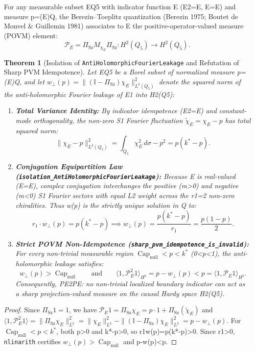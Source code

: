 \documentclass[11pt,reqno]{amsart}
\newtheorem{theorem}{Theorem}[section]
\theoremstyle{definition}
\theoremstyle{remark}
\newcommand{\CapNull}{\operatorname{Cap}_{\mathrm{null}}}
\newcommand{\PiSz}{\Pi_{\mathrm{Sz}}}
\newcommand{\Id}{\mathbb{I}}
\begin{document}
For any measurable subset EQ5 with indicator function E (E2=E, E=E) and measure p=(E)Q, the Berezin--Toeplitz quantization (Berezin 1975; Boutet de Monvel \& Guillemin 1981) associates to E the positive-operator-valued measure (POVM) element:
\begin{equation}
  \mathcal{P}_E = \PiSz M_{\chi_E} \PiSz : H^2(Q_5) \to H^2(Q_5).
\end{equation}

\begin{theorem}[Isolation of \texttt{AntiHolomorphicFourierLeakage} and Refutation of Sharp PVM Idempotence]
\label{thm:povm_leakage}
Let EQ5 be a Borel subset of normalized measure p=(E)Q, and let $w_\perp(p) = \|(\Id - \PiSz)\chi_E\|_{L^2(Q_5)}^2$ denote the squared norm of the anti-holomorphic Fourier leakage of E1 into H2(Q5):
\begin{enumerate}[label=(\roman*)]
  \item \textbf{Total Variance Identity:} By indicator idempotence (E2=E) and constant-mode orthogonality, the non-zero S1 Fourier fluctuation $\widetilde{\chi}_E = \chi_E - p$ has total squared norm:
  \begin{equation}
    \|\chi_E - p\|_{L^2(Q_5)}^2 = \int_{Q_5} \chi_E^2\,d\sigma - p^2 = p(k^* - p).
  \end{equation}
  \item \textbf{Conjugation Equipartition Law (\texttt{isolation\_AntiHolomorphicFourierLeakage}):} Because E is real-valued (E=E), complex conjugation interchanges the positive (m>0) and negative (m<0) S1 Fourier sectors with equal L2 weight across the r1=2 non-zero chiralities. Thus w(p) is the strictly unique solution in Q to:
  \begin{equation}
    r_1 \cdot w_\perp(p) = p(k^* - p) \implies w_\perp(p) = \frac{p(k^* - p)}{r_1} = \frac{p(1 - p)}{2}.
  \end{equation}
  \item \textbf{Strict POVM Non-Idempotence (\texttt{sharp\_pvm\_idempotence\_is\_invalid}):} For every non-trivial measurable region $\CapNull < p < k^*$ (0<p<1), the anti-holomorphic leakage satisfies:
  \begin{equation}
    w_\perp(p) > \CapNull \qquad \text{and} \qquad \langle 1, \mathcal{P}_E^2 1 \rangle_{H^2} = p - w_\perp(p) < p = \langle 1, \mathcal{P}_E 1 \rangle_{H^2}.
  \end{equation}
  Consequently, PE2PE: no non-trivial localized boundary indicator can act as a sharp projection-valued measure on the causal Hardy space H2(Q5).
\end{enumerate}
\end{theorem}
\begin{proof}
Since $\PiSz 1 = 1$, we have $\mathcal{P}_E 1 = \PiSz \chi_E = p \cdot 1 + \PiSz(\widetilde{\chi}_E)$ and $\langle 1, \mathcal{P}_E^2 1 \rangle = \|\PiSz \chi_E\|_{L^2}^2 = \|\chi_E\|_{L^2}^2 - \|(\Id - \PiSz)\chi_E\|_{L^2}^2 = p - w_\perp(p)$. For $\CapNull < p < k^*$, both p>0 and k*-p>0, so r1w(p)=p(k*-p)>0. Since r1>0, \texttt{nlinarith} certifies $w_\perp(p) > \CapNull$ and p-w(p)<p.
\end{proof}
\end{document}
